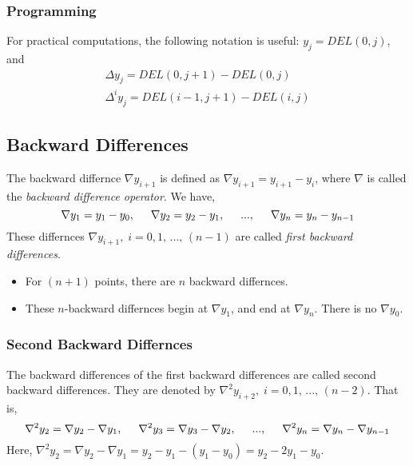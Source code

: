 \documentclass[aima203_lecturenotes_ku.tex]{subfiles}
\begin{document}
\subsubsection{Programming}
For practical computations, the following notation is useful: $y_j=DEL(0,j)$, and
\begin{gather*}
  \Delta y_j = DEL(0,j+1) - DEL(0,j) \\
  \Delta ^i y_j = DEL(i-1,j+1) - DEL(i,j)
\end{gather*}

\subsection{Backward Differences}
The backward differnce $\nabla y_{i+1}$ is defined as $\nabla y_{i+1} = y_{i+1} - y_i$, where $\nabla$ is called the \textit{backward difference operator}. We have,
\begin{equation}
  \label{backward}
  \nabla y_1 = y_1 - y_0, \hspace{5mm} \nabla y_2 = y_2 - y_1, \hspace{5mm} ..., \hspace{5mm} \nabla y_n = y_{n} - y_{n-1}
\end{equation}
These differnces $\nabla y_{i+1}, \; i=0,1,\, ..., \, (n-1)$ are called \textit{first backward differences}.

\begin{itemize}
\item For $(n+1)$ points, there are $n$ backward differnces.
\item These $n$-backward differnces begin at $\nabla y_1$, and end at $\nabla y_n$. There is no $\nabla y_0$.
\end{itemize}

\subsubsection{Second Backward Differnces}
The backward differences of the first backward differences are called second backward differences. They are denoted by $\nabla ^2 y_{i+2}, \; i=0,1,\, ..., \, (n-2)$. That is,
\begin{equation}
  \label{backward2}
  \nabla ^2 y_2 = \nabla y_2 - \nabla y_1, \hspace{5mm} \nabla ^2 y_3 = \nabla y_3 - \nabla y_2, \hspace{5mm} ..., \hspace{5mm} \nabla ^2 y_n = \nabla y_n - \nabla y_{n-1}
\end{equation}
Here, $\nabla ^2 y_2 = \nabla y_2 - \nabla y_1 = y_2 - y_1 - (y_1 - y_0) = y_2 -2y_1 - y_0$.
\end{document}
